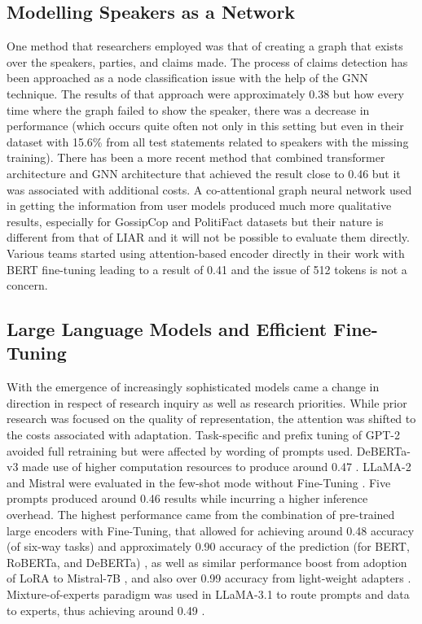 \documentclass[10pt,twocolumn,twoside,a4paper]{article}
\begin{document}
\subsection{Modelling Speakers as a Network}

One method that researchers employed was that of creating a graph that exists over the speakers, parties, and claims made. The process of claims detection has been approached as a node classification issue with the help of the GNN technique. The results of that approach were approximately 0.38 but how every time where the graph failed to show the speaker, there was a decrease in performance (which occurs quite often not only in this setting but even in their dataset with 15.6\% from all test statements related to speakers with the missing training). There has been a more recent method that combined transformer architecture and GNN architecture that achieved the result close to 0.46 but it was associated with additional costs. A co-attentional graph neural network used in getting the information from user models produced much more qualitative results, especially for GossipCop and PolitiFact datasets but their nature is different from that of LIAR and it will not be possible to evaluate them directly. Various teams started using attention-based encoder directly in their work with BERT fine-tuning leading to a result of 0.41 and the issue of 512 tokens is not a concern.

\subsection{Large Language Models and Efficient Fine-Tuning}

With the emergence of increasingly sophisticated models came a change in direction in respect of research inquiry as well as research priorities. While prior research was focused on the quality of representation, the attention was shifted to the costs associated with adaptation. Task-specific and prefix tuning of GPT-2 avoided full retraining \cite{zhou2023fine} but were affected by wording of prompts used. DeBERTa-v3 made use of higher computation resources to produce around 0.47 \cite{martinez2024deberta}. LLaMA-2 and Mistral were evaluated in the few-shot mode without Fine-Tuning \cite{kumar2024combating}. Five prompts produced around 0.46 results while incurring a higher inference overhead. The highest performance came from the combination of pre-trained large encoders with Fine-Tuning, that allowed for achieving around 0.48 accuracy (of six-way tasks) and approximately 0.90 accuracy of the prediction (for BERT, RoBERTa, and DeBERTa) \cite{alqadi2025transfer}, as well as similar performance boost from adoption of LoRA to Mistral-7B \cite{thompson2025parameter}, and also over 0.99 accuracy from light-weight adapters \cite{alghamdi2025abert}. Mixture-of-experts paradigm was used in LLaMA-3.1 to route prompts and data to experts, thus achieving around 0.49 \cite{garcia2026hybrid}.
\end{document}
